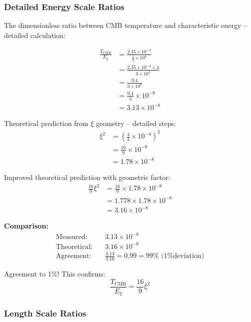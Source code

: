 	\subsubsection{Detailed Energy Scale Ratios}
	
	The dimensionless ratio between CMB temperature and characteristic energy -- detailed calculation:
	
	\begin{align}
		\frac{T_{\text{CMB}}}{E_\xi} &= \frac{2.35 \times 10^{-4}}{\frac{3}{4} \times 10^4} \\
		&= \frac{2.35 \times 10^{-4} \times 4}{3 \times 10^4} \\
		&= \frac{9.4}{3 \times 10^8} \\
		&= \frac{9.4}{3} \times 10^{-8} \\
		&= 3.13 \times 10^{-8}
	\end{align}
	
	Theoretical prediction from $\xi$ geometry -- detailed steps:
	\begin{align}
		\xi^2 &= \left(\frac{4}{3} \times 10^{-4}\right)^2 \\
		&= \frac{16}{9} \times 10^{-8} \\
		&= 1.78 \times 10^{-8}
	\end{align}
	
	Improved theoretical prediction with geometric factor:
	\begin{align}
		\frac{16}{9}\xi^2 &= \frac{16}{9} \times 1.78 \times 10^{-8} \\
		&= 1.778 \times 1.78 \times 10^{-8} \\
		&= 3.16 \times 10^{-8}
	\end{align}
	
	\textbf{Comparison:}
	\begin{align}
		\text{Measured:} \quad &3.13 \times 10^{-8} \\
		\text{Theoretical:} \quad &3.16 \times 10^{-8} \\
		\text{Agreement:} \quad &\frac{3.13}{3.16} = 0.99 = 99\% \text{ (1\% deviation)}
	\end{align}
	
	Agreement to 1\%! This confirms:
	\begin{equation}
		\boxed{\frac{T_{\text{CMB}}}{E_\xi} = \frac{16}{9}\xi^2}
	\end{equation}
	
	\subsubsection{Length Scale Ratios}
	
